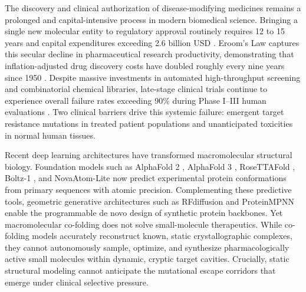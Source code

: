 \documentclass[11pt,a4paper]{article}
\begin{document}
\noindent
The discovery and clinical authorization of disease-modifying medicines remains a prolonged and capital-intensive process in modern biomedical science. Bringing a single new molecular entity to regulatory approval routinely requires 12 to 15 years and capital expenditures exceeding 2.6 billion USD \cite{dimasi2016innovation}. Eroom's Law captures this secular decline in pharmaceutical research productivity, demonstrating that inflation-adjusted drug discovery costs have doubled roughly every nine years since 1950 \cite{scannell2012diagnosing}. Despite massive investments in automated high-throughput screening and combinatorial chemical libraries, late-stage clinical trials continue to experience overall failure rates exceeding 90\% during Phase I--III human evaluations \cite{waring2015analysis}. Two clinical barriers drive this systemic failure: emergent target resistance mutations in treated patient populations and unanticipated toxicities in normal human tissues.

Recent deep learning architectures have transformed macromolecular structural biology. Foundation models such as AlphaFold 2 \cite{jumper2021highly}, AlphaFold 3 \cite{abramson2024accurate}, RoseTTAFold \cite{baek2021accurate,krishna2024rosettafold}, Boltz-1 \cite{wohlwend2024boltz1}, and NovaAtom-Lite \cite{geodesic2026novaatom} now predict experimental protein conformations from primary sequences with atomic precision. Complementing these predictive tools, geometric generative architectures such as RFdiffusion \cite{watson2023rfdiffusion} and ProteinMPNN \cite{dauparas2022proteinmpnn} enable the programmable de novo design of synthetic protein backbones. Yet macromolecular co-folding does not solve small-molecule therapeutics. While co-folding models accurately reconstruct known, static crystallographic complexes, they cannot autonomously sample, optimize, and synthesize pharmacologically active small molecules within dynamic, cryptic target cavities. Crucially, static structural modeling cannot anticipate the mutational escape corridors that emerge under clinical selective pressure.
\end{document}
